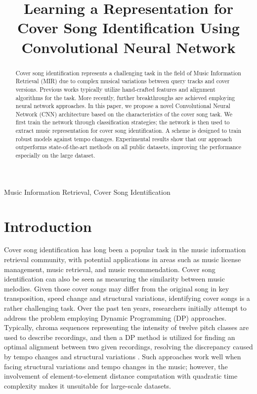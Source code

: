 \documentclass{article}
\title{Learning a Representation for Cover Song Identification Using Convolutional Neural Network}
\begin{document}
\maketitle
\begin{abstract}
Cover song identification represents a challenging task in the field of Music Information Retrieval (MIR) due to complex musical variations between query tracks and cover versions. Previous works typically utilize hand-crafted features and alignment algorithms for the task. More recently, further breakthroughs are achieved employing neural network approaches. In this paper, we propose a novel Convolutional Neural Network (CNN) architecture based on the characteristics of the cover song task. We first train the network through classification strategies; the network is then used to extract music representation for cover song identification. A scheme is designed to train robust models against tempo changes. Experimental results show that our approach outperforms state-of-the-art methods on all public datasets, improving the performance especially on the large dataset. \end{abstract}
\begin{keywords}
Music Information Retrieval, Cover Song Identification
\end{keywords}


\section{Introduction}
\label{sec:intro}

Cover song identification has long been a popular task in the music information retrieval community, with potential applications in areas such as music license management, music retrieval, and music recommendation. Cover song identification can also be seen as measuring the similarity between music melodies. Given those cover songs may differ from the original song in key transposition, speed change and structural variations, identifying cover songs is a rather challenging task. Over the past ten years, researchers initially attempt to address the problem employing Dynamic Programming (DP) approaches. Typically, chroma sequences representing the intensity of twelve pitch classes are used to describe recordings, and then a DP method is utilized for finding an optimal alignment between two given recordings, resolving the discrepancy caused by tempo changes and structural variations \cite{ellis2007identifyingcover,serra2008chroma,serra2009cross}. 
Such approaches work well when facing structural variations and tempo changes in the music; however, the involvement of element-to-element distance computation with quadratic time complexity makes it unsuitable for large-scale datasets. 
\end{document}
